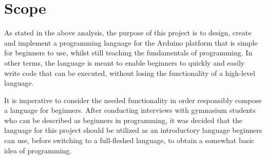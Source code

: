 \section{Scope}
As stated in the above analysis, the purpose of this project is to design, create and implement a
programming language for the Arduino platform that is simple for beginners to use, whilst still teaching the
fundamentals of programming.
In other terms, the language is meant to enable beginners to quickly and easily write
code that can be executed, without losing the functionality of a high-level language.

It is imperative to consider the needed functionality in order responsibly compose a language for
beginners.
After conducting interviews with gymnasium students who can be described as beginners in programming,
it was decided that the language for this project should be utilized as an introductory language 
beginners can use, before switching to a full-fleshed language, to obtain a somewhat basic idea of
programming.

 